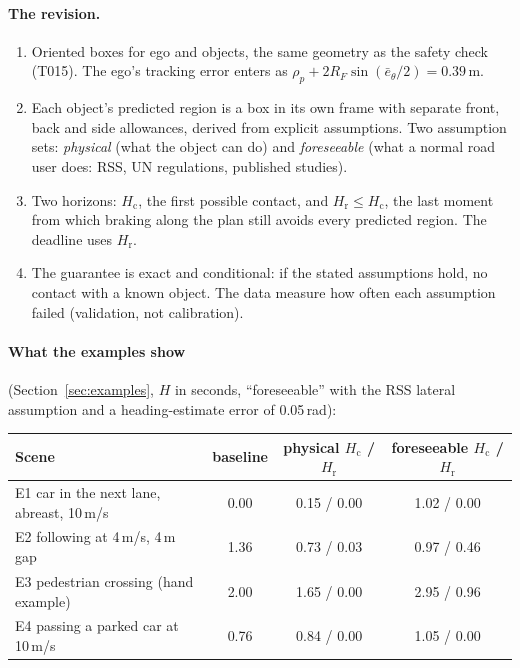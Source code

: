 \documentclass[11pt]{article}
\theoremstyle{definition}
\theoremstyle{remark}
\newcommand{\Hc}{H_{\mathrm{c}}}
\newcommand{\Hr}{H_{\mathrm{r}}}
\begin{document}
\paragraph{The revision.}
\begin{enumerate}[leftmargin=*,label=(\alph*)]
  \item Oriented boxes for ego and objects, the same geometry as the safety check (T015). The ego's
    tracking error enters as $\rho_p+2R_F\sin(\bar e_\theta/2)=0.39$\,m.
  \item Each object's predicted region is a box in its own frame with separate front, back and side
    allowances, derived from explicit assumptions. Two assumption sets: \emph{physical} (what the object can
    do) and \emph{foreseeable} (what a normal road user does: RSS, UN regulations, published studies).
  \item Two horizons: $\Hc$, the first possible contact, and $\Hr\le\Hc$, the last moment from which
    braking along the plan still avoids every predicted region. The deadline uses $\Hr$.
  \item The guarantee is exact and conditional: if the stated assumptions hold, no contact with a known
    object. The data measure how often each assumption failed (validation, not calibration).
\end{enumerate}

\paragraph{What the examples show} (Section~\ref{sec:examples}, $H$ in seconds, ``foreseeable'' with the
RSS lateral assumption and a heading-estimate error of 0.05\,rad):

\begin{center}
\begin{tabular}{p{6.0cm}ccc}
\toprule
Scene & baseline & physical $\Hc$ / $\Hr$ & foreseeable $\Hc$ / $\Hr$ \\
\midrule
E1 car in the next lane, abreast, 10\,m/s & 0.00 & 0.15 / 0.00 & 1.02 / 0.00 \\
E2 following at 4\,m/s, 4\,m gap & 1.36 & 0.73 / 0.03 & 0.97 / 0.46 \\
E3 pedestrian crossing (hand example) & 2.00 & 1.65 / 0.00 & 2.95 / 0.96 \\
E4 passing a parked car at 10\,m/s & 0.76 & 0.84 / 0.00 & 1.05 / 0.00 \\
\bottomrule
\end{tabular}
\end{center}
\end{document}
